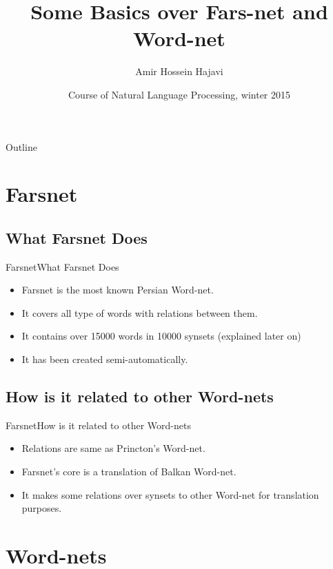 \documentclass{beamer}
\title{Some Basics over Fars-net and Word-net}
\subtitle{}
\author{Amir Hossein Hajavi}
\institute[University of Tehran]{ %
University of Tehran
}
\date{Course of Natural Language Processing, winter 2015}
\begin{document}
 \begin{frame}
\titlepage
\end{frame}

 \begin{frame}{Outline}
\tableofcontents
\end{frame}

\section{Farsnet}

\subsection{What Farsnet Does}

\begin{frame}{Farsnet}{What Farsnet Does}
	\begin{itemize}
		\item<1-> {	Farsnet is the most known Persian Word-net. }
   	    \item<2-> {	It covers all type of words with relations between them.}
		\item<3-> {	It contains over 15000 words in 10000 synsets (explained later on)}
		\item<4-> {	It has been created semi-automatically.}
	\end{itemize}
\end{frame}

\subsection{How is it related to other Word-nets}	

\begin{frame}{Farsnet}{How is it related to other Word-nets}
	\begin{itemize}
		\item<1-> { Relations are same as Princton's Word-net. }
		\item<2-> {	Farsnet's core is a translation of Balkan Word-net. }
		\item<3-> {	It makes some relations over synsets to other Word-net for translation purposes. }
	\end{itemize}
\end{frame}

\section{Word-nets}
\end{document}
